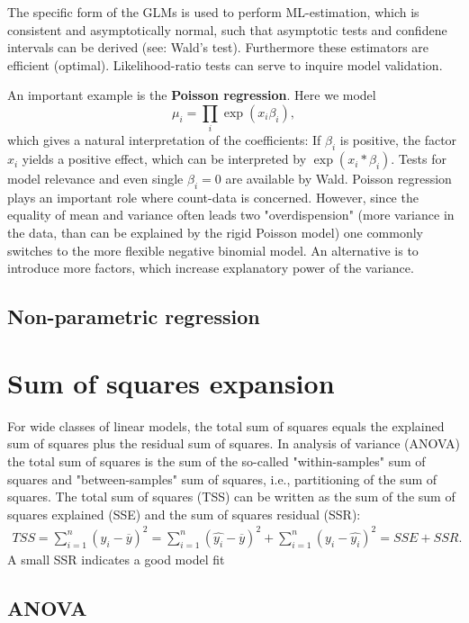 \documentclass[12pt,a4paper]{amsart}
\theoremstyle{definition}
\theoremstyle{remark}
\numberwithin{equation}{section}
\begin{document}
 The specific form of the GLMs is used to perform ML-estimation, which is consistent and asymptotically normal, such that asymptotic tests and confidene intervals can be derived (see: Wald's test). Furthermore these estimators are efficient (optimal). Likelihood-ratio tests can serve to inquire model validation. 
 
 
 An important example is the \textbf{Poisson regression}. Here we model 
 $$ \mu_i= \prod_i \exp(x_i \beta_i),$$
which gives a natural interpretation of the coefficients: If $\beta_i$ is positive, the factor $x_i$ yields a positive effect, which can be interpreted by $\exp(x_i*\beta_i)$. Tests for model relevance and even single $\beta_i =0$ are available by Wald. Poisson regression plays an important role where count-data is concerned. However, since the equality of mean and variance often leads two "overdispension" (more variance in the data, than can be explained by the rigid Poisson model) one commonly switches to the more flexible negative binomial model. An alternative is to introduce more factors, which increase explanatory power of the variance. 



\subsection{Non-parametric regression} %

\section{Sum of squares expansion}
For wide classes of linear models, the total sum of squares equals the explained sum of squares plus the residual sum of squares. In analysis of variance (ANOVA) the total sum of squares is the sum of the so-called "within-samples" sum of squares and "between-samples" sum of squares, i.e., partitioning of the sum of squares.
The total sum of squares (TSS) can be written as the sum of the sum of squares explained (SSE) and the sum of squares residual (SSR):
\begin{align*}
TSS= \sum_{i=1}^n \left(y_i-\overline{y}\right)^2 = \sum_{i=1}^n \left(\hat{y_i}-\overline{y}\right)^2+\sum_{i=1}^n \left(y_i-\hat{y_i}\right)^2=SSE+SSR.
\end{align*}
A small SSR indicates a good model fit %

\subsection{ANOVA}
\end{document}
